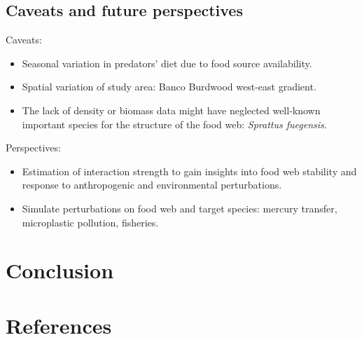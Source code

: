 \documentclass[preprint, 3p,
authoryear]{elsarticle} %
\begin{document}
\hypertarget{caveats-and-future-perspectives}{%
\subsection{Caveats and future
perspectives}\label{caveats-and-future-perspectives}}

Caveats:

\begin{itemize}
\item
  Seasonal variation in predators' diet due to food source availability.
\item
  Spatial variation of study area: Banco Burdwood west-east gradient.
\item
  The lack of density or biomass data might have neglected well-known
  important species for the structure of the food web: \emph{Sprattus
  fuegensis}.
\end{itemize}

Perspectives:

\begin{itemize}
\item
  Estimation of interaction strength to gain insights into food web
  stability and response to anthropogenic and environmental
  perturbations.
\item
  Simulate perturbations on food web and target species: mercury
  transfer, microplastic pollution, fisheries.
\end{itemize}

\hypertarget{conclusion}{%
\section{Conclusion}\label{conclusion}}

\hypertarget{references}{%
\section*{References}\label{references}}
\end{document}
